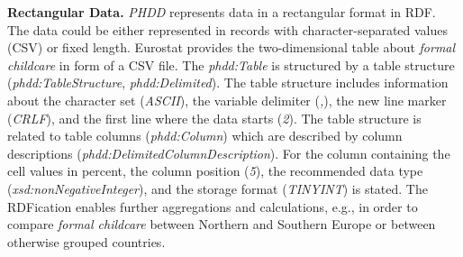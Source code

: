 \documentclass{llncs}
\begin{document}
\textbf{Rectangular Data.}
\emph{PHDD} represents data in a rectangular format in RDF. 
The data could be either represented in records with character-separated values (CSV) or fixed length. 
Eurostat provides the two-dimensional table about \emph{formal childcare} in form of a CSV file. 
The \emph{phdd:Table} is structured by a table structure (\emph{phdd:TableStructure}, \emph{phdd:Delimited}).
The table structure includes information about the character set (\emph{ASCII}), the variable delimiter (\emph{,}), the new line marker (\emph{CRLF}), and the first line where the data starts (\emph{2}).
The table structure is related to table columns (\emph{phdd:Column}) which are described by column descriptions (\emph{phdd:DelimitedColumnDescription}).
For the column containing the cell values in percent, the column position (\emph{5}), the recommended data type (\emph{xsd:nonNegativeInteger}), and the storage format (\emph{TINYINT}) is stated. 
The RDFication enables further aggregations and calculations, e.g., in order to compare \emph{formal childcare} between Northern and Southern Europe or between otherwise grouped countries.
\end{document}
